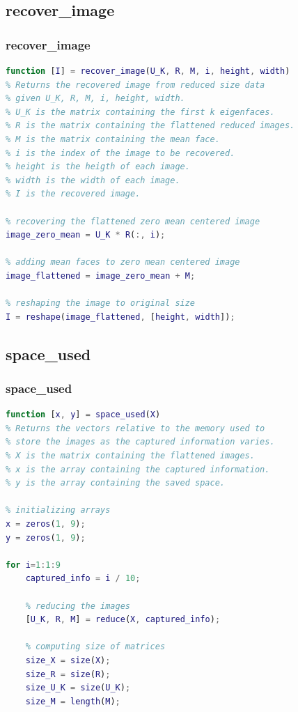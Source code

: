 \documentclass[10pt]{beamer}
\begin{document}
\subsection{recover\_image}
\begin{frame}[fragile]
    \frametitle{recover\_image}

    \begin{lstlisting}[language=Matlab, numbers=none]
function [I] = recover_image(U_K, R, M, i, height, width)
% Returns the recovered image from reduced size data 
% given U_K, R, M, i, height, width.
% U_K is the matrix containing the first k eigenfaces.
% R is the matrix containing the flattened reduced images.
% M is the matrix containing the mean face.
% i is the index of the image to be recovered.
% height is the heigth of each image.
% width is the width of each image.
% I is the recovered image.

% recovering the flattened zero mean centered image
image_zero_mean = U_K * R(:, i);  

% adding mean faces to zero mean centered image
image_flattened = image_zero_mean + M;  

% reshaping the image to original size
I = reshape(image_flattened, [height, width]);

    \end{lstlisting}
    
\end{frame}

\subsection{space\_used}
\begin{frame}[fragile]
    \frametitle{space\_used}

    \begin{lstlisting}[language=Matlab, numbers=none]
function [x, y] = space_used(X)
% Returns the vectors relative to the memory used to 
% store the images as the captured information varies.
% X is the matrix containing the flattened images.
% x is the array containing the captured information.
% y is the array containing the saved space.

% initializing arrays
x = zeros(1, 9);
y = zeros(1, 9);

for i=1:1:9
    captured_info = i / 10;
    
    % reducing the images
    [U_K, R, M] = reduce(X, captured_info);
    
    % computing size of matrices
    size_X = size(X);
    size_R = size(R);
    size_U_K = size(U_K);
    size_M = length(M);
    \end{lstlisting}
    
\end{frame}
\end{document}
